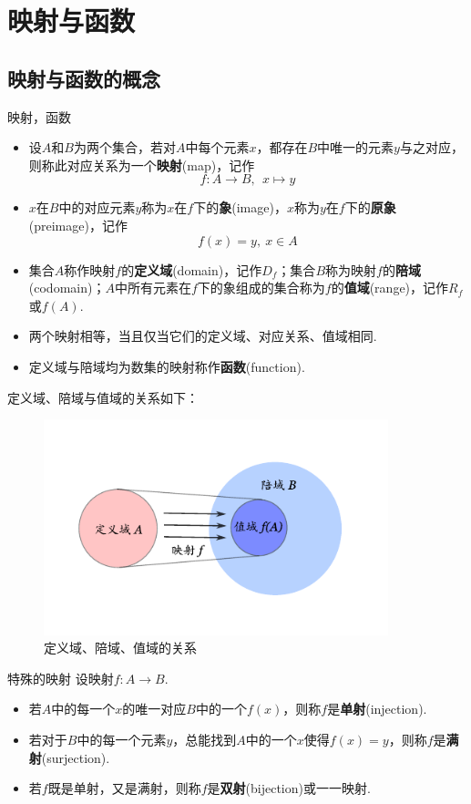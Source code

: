 \documentclass[lang=cn, zihao=5]{elegantbook}
\begin{document}
\section{映射与函数}

\subsection{映射与函数的概念}

\begin{definition}{映射，函数}
	\begin{itemize}
		\item 设$A$和$B$为两个集合，若对$A$中每个元素$x$，都存在$B$中唯一的元素$y$与之对应，则称此对应关系为一个\textbf{映射}(map)，记作$$f:A \to B,~~x \mapsto y$$
		\item $x$在$B$中的对应元素$y$称为$x$在$f$下的\textbf{象}(image)，$x$称为$y$在$f$下的\textbf{原象}(preimage)，记作$$f(x) = y,~ x \in A$$
		\item 集合$A$称作映射$f$的\textbf{定义域}(domain)，记作$D_f$；集合$B$称为映射$f$的\textbf{陪域}(codomain)；$A$中所有元素在$f$下的象组成的集合称为$f$的\textbf{值域}(range)，记作$R_f$或$f(A)$.
		\item 两个映射相等，当且仅当它们的定义域、对应关系、值域相同.
		\item 定义域与陪域均为数集的映射称作\textbf{函数}(function).
	\end{itemize}
\end{definition}

定义域、陪域与值域的关系如下：

\begin{figure}[h!]
	\centering
	\includegraphics[width=10cm]{attachment/20230403ykue.pdf}
	\caption{定义域、陪域、值域的关系}
\end{figure}

\begin{definition}{特殊的映射}
	设映射$f:A \to B$.
	\begin{itemize}
		\item 若$A$中的每一个$x$的唯一对应$B$中的一个$f(x)$，则称$f$是\textbf{单射}(injection).
		\item 若对于$B$中的每一个元素$y$，总能找到$A$中的一个$x$使得$f(x)=y$，则称$f$是\textbf{满射}(surjection).
		\item 若$f$既是单射，又是满射，则称$f$是\textbf{双射}(bijection)或一一映射.
	\end{itemize}
\end{definition}
\end{document}
